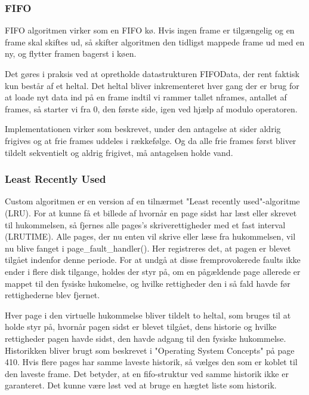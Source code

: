 \subsubsection{FIFO}
FIFO algoritmen virker som en FIFO kø. Hvis ingen frame er tilgængelig og en frame skal skiftes ud, så skifter algoritmen den tidligst mappede frame ud med en ny, og flytter framen bagerst i køen.

Det gøres i praksis ved at opretholde datastrukturen FIFOData, der rent faktisk kun består af et heltal. Det heltal bliver inkrementeret hver gang der er brug for at loade nyt data ind på en frame indtil vi rammer tallet nframes, antallet af frames, så starter vi fra 0, den første side, igen ved hjælp af modulo operatoren.

Implementationen virker som beskrevet, under den antagelse at sider aldrig frigives og at frie frames uddeles i rækkefølge. Og da alle frie frames først bliver tildelt sekventielt og aldrig frigivet, må antagelsen holde vand.


\subsubsection{Least Recently Used}
\label{subsubsec:custom}
Custom algoritmen er en version af en tilnærmet "Least recently used"-algoritme (LRU). For at kunne få et billede af hvornår en page sidst har læst eller skrevet til hukommelsen, så fjernes alle pages's skriverettigheder med et fast interval (LRUTIME). Alle pages, der nu enten vil skrive eller læse fra hukommelsen, vil nu blive fanget i page\_fault\_handler(). Her registreres det, at pagen er blevet tilgået indenfor denne periode. For at undgå at disse fremprovokerede faults ikke ender i flere disk tilgange, holdes der styr på, om en pågældende page allerede er mappet til den fysiske hukomelse, og hvilke rettigheder den i så fald havde før rettighederne blev fjernet.

Hver page i den virtuelle hukommelse bliver tildelt to heltal, som bruges til at holde styr på, hvornår pagen sidst er blevet tilgået, dens historie og hvilke rettigheder pagen havde sidst, den havde adgang til den fysiske hukommelse. Historikken bliver brugt som beskrevet i "Operating System Concepts" på page 410. Hvis flere pages har samme laveste historik, så vælges den som er koblet til den laveste frame. Det betyder, at en fifo-struktur ved samme historik ikke er garanteret. Det kunne være løst ved at bruge en hægtet liste som historik.

